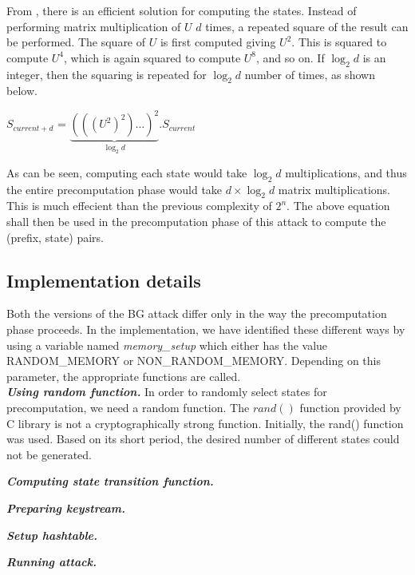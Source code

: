 From \cite{erik-discussions}, there is an efficient solution for computing the states. Instead of performing matrix multiplication of $U$ $d$ times, a repeated square of the result can be performed. The square of $U$ is first computed giving $U^2$. This is squared to compute $U^4$, which is again squared to compute $U^8$, and so on. If $\log_2{d}$ is an integer, then the squaring is repeated for $\log_2{d}$ number of times, as shown below.

\begin{center}
\large{$S_{current + d}$ = $\underbrace{(((U^2)^2) \dotsc )^2}_{\log_2{d}} . S_{current}$}\\
\end{center}
\label{eq:state-trans}

As can be seen, computing each state would take $\log_2{d}$ multiplications, and thus the entire precomputation phase would take $d \times \log_2{d}$ matrix multiplications. This is much effecient than the previous complexity of $2^n$. The above equation shall then be used in the precomputation phase of this attack to compute the (prefix, state) pairs.

\subsection{Implementation details}

Both the versions of the BG attack differ only in the way the precomputation phase proceeds. In the implementation, we have identified these different ways by using a variable named \emph{memory\_setup} which either has the value RANDOM\_MEMORY or NON\_RANDOM\_MEMORY. Depending on this parameter, the appropriate functions are called.\\

\textit{\textbf{Using random function.}}
In order to randomly select states for precomputation, we need a random function. The $rand()$ function provided by C library is not a cryptographically strong function. Initially, the rand() function was used. Based on its short period, the desired number of different states could not be generated. 

\textit{\textbf{Computing state transition function.}}


\textit{\textbf{Preparing keystream.}}


\textit{\textbf{Setup hashtable.}}


\textit{\textbf{Running attack.}}




